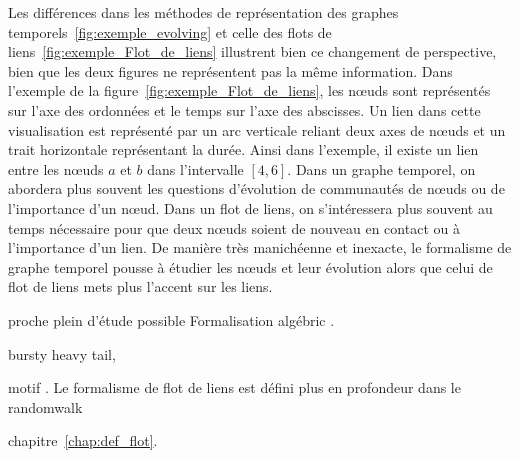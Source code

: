 Les différences dans les méthodes de représentation des graphes temporels~\ref{fig:exemple_evolving} et celle des flots de liens~\ref{fig:exemple_Flot_de_liens} illustrent bien ce changement de perspective, bien que les deux figures ne représentent pas la même information.
Dans l'exemple de la figure~\ref{fig:exemple_Flot_de_liens}, les n\oe uds sont représentés sur l'axe des ordonnées et le temps sur l'axe des abscisses.
Un lien dans cette visualisation est représenté par un arc verticale reliant deux axes de n\oe uds et un trait horizontale représentant la durée.
Ainsi dans l'exemple, il existe un lien entre les n\oe uds $a$ et $b$ dans l'intervalle $[4,6]$.
Dans un graphe temporel, on abordera plus souvent les questions d'évolution de communautés de n\oe uds ou de l'importance d'un n\oe ud.
Dans un flot de liens, on s'intéressera plus souvent au temps nécessaire pour que deux n\oe uds soient de nouveau en contact ou à l'importance d'un lien.
De manière très manichéenne et inexacte, le formalisme de graphe temporel pousse à étudier les n\oe uds et leur évolution alors que celui de flot de liens mets plus l'accent sur les liens.

proche\cite{Matias2015}
\cite{Holme2013a,Holme2015b,Holme2015} plein d'étude possible
Formalisation algébric \cite{Batagelj2015}.

bursty \cite{Karsai2012a,Karsai2011,Moinet2015,Stehle2010} \cite{Malmgren2008,Malmgren2009} heavy tail, \cite{Rocha2013}

motif \cite{Kovanen2011a,Kovanen2013}.
Le formalisme de flot de liens est défini plus en profondeur dans le 
randomwalk\cite{Starnini2012b}




chapitre~\ref{chap:def_flot}.


